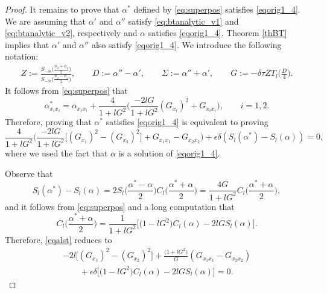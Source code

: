 \documentclass[pdftex]{sigma}
\numberwithin{equation}{section}
\begin{document}
\begin{proof}
It remains to prove that $\alpha^*$ defined by \eqref{eq:superpos} satisfies \eqref{eqorig1_4}. We are assuming that
$\alpha'$ and $\alpha''$ satisfy \eqref{eq:btanalytic_v1} and \eqref{eq:btanalytic_v2}, respectively and $\alpha$ satisfies \eqref{eqorig1_4}. Theorem \ref{thBT} implies that $\alpha'$ and $\alpha''$ also satisfy \eqref{eqorig1_4}. We introduce the following notation:
\begin{gather}\label{Sigmaetall}
Z:= \frac{S_{-\delta\epsilon}\bigl(\frac{\phi_2+\phi_1}{2}\bigr) } {S_{-\delta\epsilon}\bigl(\frac{\phi_2-\phi_1}{2}\bigr)},\qquad D:=\alpha''-\alpha', \qquad \Sigma:=\alpha''+\alpha',
\qquad G:= -\delta\tau Z T_l \biggl(\frac{D}{4}\biggr).
\end{gather}
It follows from \eqref{eq:superpos} that
\begin{equation*}
\alpha^*_{x_ix_i}=\alpha_{x_ix_i}+\frac{4}{1+l G^2}\biggl(\frac{-2l G}{1+l G^2}(G_{x_i})^2+G_{x_ix_i}\biggr), \qquad i=1,2.
\end{equation*}
Therefore, proving that $\alpha^*$ satisfies \eqref{eqorig1_4} is equivalent to
proving
\begin{equation}\label{eqalst}
\frac{4}{1+l G^2}
\biggl(\frac{-2l G}{1+l G^2}\bigl[(G_{x_1})^2-(G_{x_2})^2\bigr]+G_{x_1x_1}-G_{x_2x_2} \biggr) +\epsilon\delta ( S_l(\alpha^*)-S_l(\alpha))=0,
\end{equation}
where we used the fact that $\alpha$ is a solution of \eqref{eqorig1_4}.

Observe that
\[
S_l(\alpha^*)-S_l(\alpha)=2S_l\biggl(\frac{\alpha^*-\alpha}{2}\biggr) C_l\biggl(\frac{\alpha^*+\alpha}{2}\biggr)=
\frac{4G}{1+l G^2}C_l\biggl(\frac{\alpha^*+\alpha}{2}\biggr),
\]
and it follows from \eqref{eq:superpos} and a long computation that
\[
C_l\biggl(\frac{\alpha^*+\alpha}{2}\biggr)=\frac{1}{1+l G^2}\bigl[ \bigl(1-l G^2\bigr)C_l(\alpha)-2l G S_l(\alpha)\bigr].
\]
Therefore, \eqref{eqalst} reduces to
\begin{gather}
-2l\bigl[(G_{x_1})^2-(G_{x_2})^2\bigr]+\frac{\bigl(1+l G^2\bigr)}{G}(G_{x_1x_1}-G_{x_2x_2}) \nonumber\\
\qquad{}+\epsilon\delta\bigl[ \bigl(1-l G^2\bigr)C_l(\alpha)-2l G S_l(\alpha)\bigr]=0.\label{eqalst1}
\end{gather}



\end{proof}
\end{document}

